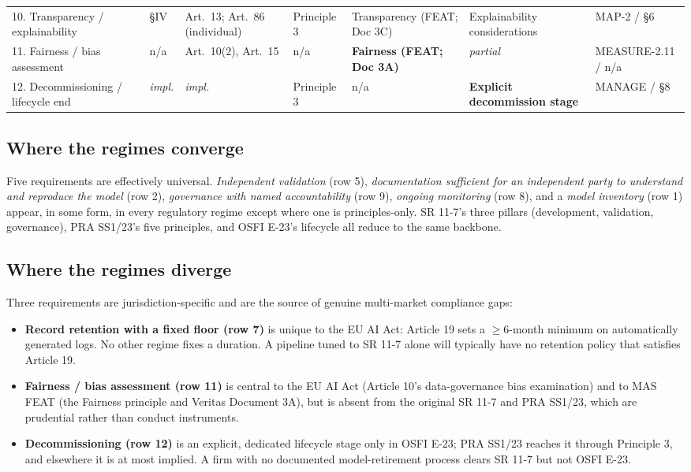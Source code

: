 \begin{landscape}
\begin{table}[p]
\begin{tabular}{@{}p{3.0cm}p{2.6cm}p{3.0cm}p{2.4cm}p{2.6cm}p{2.4cm}p{2.6cm}@{}}
10. Transparency / explainability & \S IV & Art.~13; Art.~86 (individual) & Principle 3 & Transparency (FEAT; Doc 3C) & Explainability considerations & MAP-2 / \S 6 \\
11. Fairness / bias assessment & n/a & Art.~10(2), Art.~15 & n/a & \textbf{Fairness (FEAT; Doc 3A)} & \textit{partial} & MEASURE-2.11 / n/a \\
12. Decommissioning / lifecycle end & \textit{impl.} & \textit{impl.} & Principle 3 & n/a & \textbf{Explicit decommission stage} & MANAGE / \S 8 \\
\bottomrule
\end{tabular}
\end{table}
\end{landscape}

\subsection{Where the regimes converge}\label{sec:converge}

Five requirements are effectively universal. \emph{Independent validation} (row 5), \emph{documentation sufficient for an independent party to understand and reproduce the model} (row 2), \emph{governance with named accountability} (row 9), \emph{ongoing monitoring} (row 8), and a \emph{model inventory} (row 1) appear, in some form, in every regulatory regime except where one is principles-only. SR 11-7's three pillars (development, validation, governance), PRA SS1/23's five principles, and OSFI E-23's lifecycle all reduce to the same backbone.

\subsection{Where the regimes diverge}\label{sec:diverge}

Three requirements are jurisdiction-specific and are the source of genuine multi-market compliance gaps:

\begin{itemize}[leftmargin=*]
    \item \textbf{Record retention with a fixed floor (row 7)} is unique to the EU AI Act: Article 19 sets a $\geq$6-month minimum on automatically generated logs. No other regime fixes a duration. A pipeline tuned to SR 11-7 alone will typically have no retention policy that satisfies Article 19.
    \item \textbf{Fairness / bias assessment (row 11)} is central to the EU AI Act (Article 10's data-governance bias examination) and to MAS FEAT (the Fairness principle and Veritas Document 3A), but is absent from the original SR 11-7 and PRA SS1/23, which are prudential rather than conduct instruments.
    \item \textbf{Decommissioning (row 12)} is an explicit, dedicated lifecycle stage only in OSFI E-23; PRA SS1/23 reaches it through Principle 3, and elsewhere it is at most implied. A firm with no documented model-retirement process clears SR 11-7 but not OSFI E-23.
\end{itemize}

